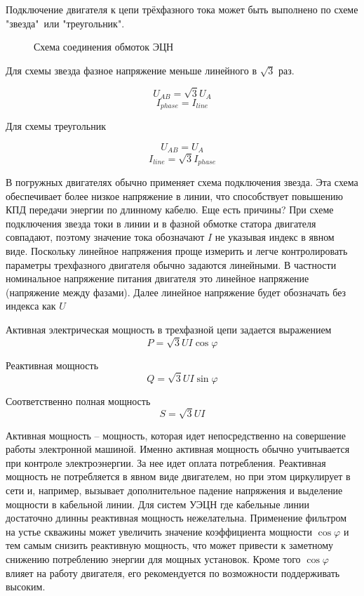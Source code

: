 Подключение двигателя к цепи трёхфазного тока может быть выполнено по схеме "звезда"\ или "треугольник".


\begin{figure}[h!]
	\begin{center}
		
		\caption{Схема соединения обмоток ЭЦН}
		\label{ris:electicity_triangle_star}
	\end{center}
\end{figure}

Для схемы звезда фазное напряжение меньше линейного в $\sqrt{3}$ раз.

$$ U_{AB} = \sqrt{3} U_{A} $$
$$ I_{phase} = I_{line} $$

Для схемы треугольник 

$$ U_{AB} =  U_{A} $$
$$ I_{line} =\sqrt{3} I_{phase} $$


В погружных двигателях обычно применяет схема подключения звезда. Эта схема обеспечивает более низкое напряжение в линии, что способствует повышению КПД передачи энергии по длинному кабелю. Еще есть причины?
При схеме подключения звезда токи в линии и в фазной обмотке статора двигателя совпадают, поэтому значение тока обозначают $I$ не указывая индекс в явном виде. Поскольку линейное напряжения проще измерить и легче контролировать параметры трехфазного двигателя обычно задаются линейными. В частности номинальное напряжение питания двигателя это линейное напряжение (напряжение между фазами). Далее линейное напряжение будет обозначать без индекса как $U$

Активная электрическая мощность в трехфазной цепи задается выражением 
$$ P= \sqrt{3}U I \cos \varphi$$

Реактивная мощность 
$$ Q= \sqrt{3}U I \sin \varphi$$

Соответственно полная мощность 
$$ S= \sqrt{3}U I $$

Активная мощность -- мощность, которая идет непосредственно на совершение работы электронной машиной. Именно активная мощность обычно учитывается при контроле электроэнергии. За нее идет оплата потребления. Реактивная мощность не потребляется в явном виде двигателем, но при этом циркулирует в сети и, например, вызывает дополнительное падение напряжения и выделение мощности в кабельной линии. Для систем УЭЦН где кабельные линии достаточно длинны реактивная мощность нежелательна. Применение фильтром на устье скважины может увеличить значение коэффициента мощности $ \cos \varphi$ и тем самым снизить реактивную мощность, что может привести к заметному снижению потреблению энергии для мощных установок. Кроме того $ \cos \varphi$ влияет на работу двигателя, его рекомендуется по возможности поддерживать высоким. 

